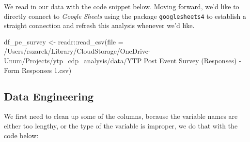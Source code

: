 \documentclass[
  letterpaper,
  DIV=11,
  numbers=noendperiod]{scrartcl}
\newenvironment{Shaded}{\begin{snugshade}}{\end{snugshade}}
\newcommand{\AttributeTok}[1]{\textcolor[rgb]{0.40,0.45,0.13}{#1}}
\newcommand{\FunctionTok}[1]{\textcolor[rgb]{0.28,0.35,0.67}{#1}}
\newcommand{\NormalTok}[1]{\textcolor[rgb]{0.00,0.23,0.31}{#1}}
\newcommand{\OtherTok}[1]{\textcolor[rgb]{0.00,0.23,0.31}{#1}}
\newcommand{\SpecialCharTok}[1]{\textcolor[rgb]{0.37,0.37,0.37}{#1}}
\newcommand{\StringTok}[1]{\textcolor[rgb]{0.13,0.47,0.30}{#1}}
\begin{document}
We read in our data with the code snippet below. Moving forward, we'd
like to directly connect to \emph{Google Sheets} using the package
\texttt{googlesheets4} to establish a straight connection and refresh
this analysis whenever we'd like.

\begin{Shaded}
\begin{Highlighting}[]
\NormalTok{df\_pe\_survey }\OtherTok{\textless{}{-}}\NormalTok{ readr}\SpecialCharTok{::}\FunctionTok{read\_csv}\NormalTok{(}\AttributeTok{file =} \StringTok{\textquotesingle{}/Users/rszarek/Library/CloudStorage/OneDrive{-}Unum/Projects/ytp\_cdp\_analysis/data/YTP Post Event Survey (Responses) {-} Form Responses 1.csv\textquotesingle{}}\NormalTok{)}
\end{Highlighting}
\end{Shaded}

\hypertarget{data-engineering}{%
\subsection{Data Engineering}\label{data-engineering}}

We first need to clean up some of the columns, because the variable
names are either too lengthy, or the type of the variable is improper,
we do that with the code below:
\end{document}
